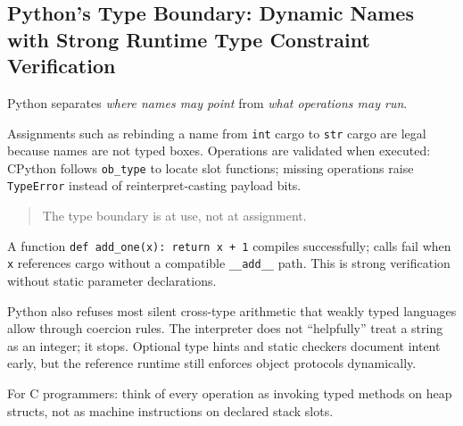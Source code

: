 \subsection{Python's Type Boundary: Dynamic Names with Strong Runtime Type Constraint Verification}

Python separates \emph{where names may point} from \emph{what operations may run}.

Assignments such as rebinding a name from \texttt{int} cargo to \texttt{str} cargo are legal because names are not typed boxes. Operations are validated when executed: CPython follows \texttt{ob\_type} to locate slot functions; missing operations raise \texttt{TypeError} instead of reinterpret-casting payload bits.

\begin{quote}
The type boundary is at use, not at assignment.
\end{quote}

A function \texttt{def add\_one(x): return x + 1} compiles successfully; calls fail when \texttt{x} references cargo without a compatible \texttt{\_\_add\_\_} path. This is strong verification without static parameter declarations.

Python also refuses most silent cross-type arithmetic that weakly typed languages allow through coercion rules. The interpreter does not ``helpfully'' treat a string as an integer; it stops. Optional type hints and static checkers document intent early, but the reference runtime still enforces object protocols dynamically.

For C programmers: think of every operation as invoking typed methods on heap structs, not as machine instructions on declared stack slots.
